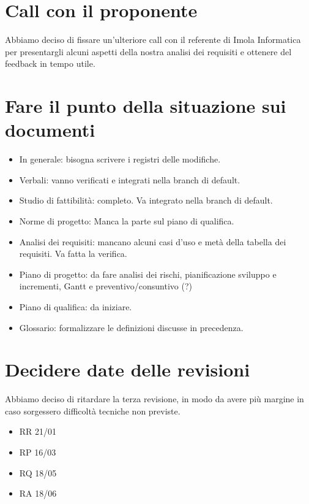 \documentclass{article}
\begin{document}
\section{Call con il proponente}%
\label{sec:call_con_il_proponente}

Abbiamo deciso di fissare un'ulteriore call con il referente di Imola Informatica per presentargli alcuni aspetti della nostra analisi dei requisiti e ottenere del feedback in tempo utile.

\section{Fare il punto della situazione sui documenti}%
\label{sec:fare_il_punto_della_situazione_sui_documenti}

\begin{itemize}
  \item In generale: bisogna scrivere i registri delle modifiche.
  \item Verbali: vanno verificati e integrati nella branch di default.
  \item Studio di fattibilità: completo. Va integrato nella branch di default.
  \item Norme di progetto: Manca la parte sul piano di qualifica.
  \item Analisi dei requisiti: mancano alcuni casi d'uso e metà della tabella dei requisiti. Va fatta la verifica.
  \item Piano di progetto: da fare analisi dei rischi, pianificazione sviluppo e incrementi, Gantt e preventivo/consuntivo (?)
  \item Piano di qualifica: da iniziare.
  \item Glossario: formalizzare le definizioni discusse in precedenza.
\end{itemize}

\section{Decidere date delle revisioni}%
\label{sec:decidere_date_delle_revisioni}

Abbiamo deciso di ritardare la terza revisione, in modo da avere più margine in caso sorgessero difficoltà tecniche non previste.

\begin{itemize}
  \item RR 21/01
  \item RP 16/03
  \item RQ 18/05
  \item RA 18/06
\end{itemize}
\end{document}
